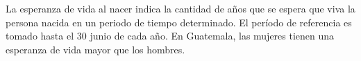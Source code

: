La esperanza de vida al nacer indica la cantidad de años que se espera que viva la persona nacida en un periodo de tiempo determinado. El período de referencia es tomado hasta el 30 junio de cada año.  En Guatemala, las mujeres tienen una esperanza de vida mayor que los hombres.